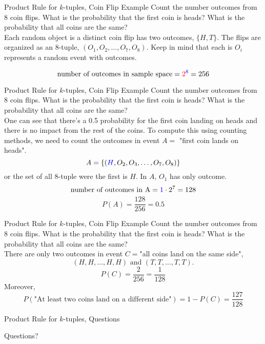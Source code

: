 \documentclass[]{beamer}
\newcommand{\blue}[1]{{\color{blue} #1}}
\newcommand{\red}[1]{{\color{red} #1}}
\newcommand{\qtns}[0]{\begin{center} Questions? \end{center}}
\newcommand{\nl}[1]{\vspace{#1 em}}
\begin{document}
\begin{frame}{Product Rule for $k$-tuples, Coin Flip Example}
    Count the number outcomes from \blue{8} \red{coin flips}. What is the probability that the first coin is heads? What is the probability that all coins are the same?\\
    \nl{0.5}
    \pause Each \red{random object} is a distinct \red{coin flip} has \red{two outcomes}, $\{H,T\}$. The flips are organized as an \blue{8}-tuple, $(O_1,O_2,\ldots,O_7,O_8)$. Keep in mind that each is $O_i$ represents a random event with outcomes.

    \pause \[\text{number of outcomes in sample space} = \red{2}^\blue{8} =256\]
\end{frame}

\begin{frame}{Product Rule for $k$-tuples, Coin Flip Example}
    Count the number outcomes from 8 coin flips. What is the probability that the first coin is heads? What is the probability that all coins are the same?\\
    \nl{0.5}
    \pause One can see that there's a 0.5 probability for the first coin landing on heads and there is no impact from the rest of the coins. \pause To compute this using counting methods, we need to count the outcomes in event $A = $ "first coin lands on heads".
    \[A=\{ (\blue{H}, O_2, O_3, \ldots, O_7, O_8) \}\]
    or the set of all 8-tuple were the first is $H$. \blue{In $A$, $O_1$ has only outcome.}
    \pause \[\text{number of outcomes in A} = \blue{1}\cdot 2^7 =128\]
    \[P(A) = \frac{128}{256} = 0.5\]
\end{frame}

\begin{frame}{Product Rule for $k$-tuples, Coin Flip Example}
    Count the number outcomes from 8 coin flips. What is the probability that the first coin is heads? What is the probability that all coins are the same?\\
    \nl{0.5}
    \pause There are only two outcomes in event $C =$"all coins land on the same side",
    \[(H,H, \ldots, H,H) \text{ and } (T,T, \ldots, T,T).\]
    \[P(C) = \frac{2}{256} = \frac{1}{128}\]
    \pause Moreover, 
    \[P(\text{"At least two coins land on a different side"}) = 1-P(C) = \frac{127}{128}\]
\end{frame}

\begin{frame}{Product Rule for $k$-tuples, Questions}
    \qtns
\end{frame}
\end{document}
